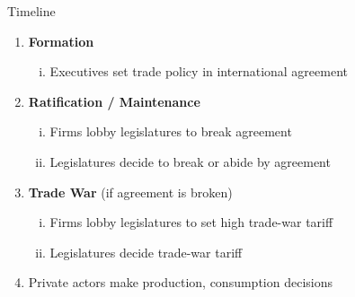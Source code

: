 \documentclass[handout]{beamer}
\newcommand{\bta}{\bm{\tau^a}}
\newcommand{\btn}{\bm{\tau^{tw}}}
\newcommand{\ta}{\theta}
\begin{document}
\begin{frame}{Timeline}
\begin{enumerate}
	\item {\color{gray} \textbf{Formation}}
		\begin{enumerate}[i.]
			\item {\color{gray} Executives set trade policy in international agreement}
		\end{enumerate}
	\item \textbf{Ratification / Maintenance}
		\begin{enumerate}[i.]
			\item {\color{gray} Firms lobby legislatures to break agreement}
			\item Legislatures decide to break or abide by agreement
		\end{enumerate}
	\item {\color{gray} \textbf{Trade War} (if agreement is broken)}
		\begin{enumerate}[i.]
			\item {\color{gray} Firms lobby legislatures to set high trade-war tariff}
			\item {\color{gray} Legislatures decide trade-war tariff}
		\end{enumerate}
	\item {\color{gray} Private actors make production, consumption decisions}
\end{enumerate}
\end{frame}


\end{document}
